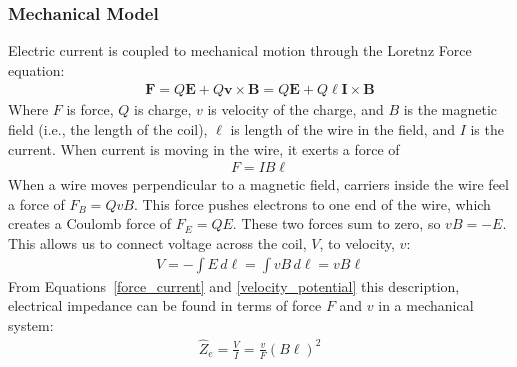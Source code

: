 \documentclass[10pt,letterpaper]{article}
\begin{document}
\subsubsection{Mechanical Model}\label{mechanical_section}
Electric current is coupled to mechanical motion through the Loretnz Force equation:
\begin{align}
\mathbf{F}=Q\mathbf{E}+Q\mathbf{v}\times \mathbf{B}=Q\mathbf{E}+Q\ell\mathbf{I}\times \mathbf{B}
\end{align}
Where $F$ is force, $Q$ is charge, $v$ is velocity of the charge, and $B$ is the magnetic field (i.e., the length of the coil), $\ell$ is length of the wire in the field, and $I$ is the current. When current is moving in the wire, it exerts a force of
\begin{align}
F=IB\ell\label{force_current}
\end{align}
When a wire moves perpendicular to a magnetic field, carriers inside the wire feel a force of $F_B=QvB$. This force pushes electrons to one end of the wire, which creates a Coulomb force of $F_E=QE$. These two forces sum to zero, so $vB=-E$. This allows us to connect voltage across the coil, $V$, to velocity, $v$:
\begin{align}
V=-\int E\,d\ell=\int vB\,d\ell=vB\ell\label{velocity_potential}
\end{align}
From Equations~\ref{force_current} and \ref{velocity_potential} this description, electrical impedance can be found in terms of force $F$ and $v$ in a mechanical system:
\begin{align}
\hat{Z}_e=\frac{V}{I}=\frac{v}{F}\left(B\ell\right)^2
\end{align}
\end{document}
